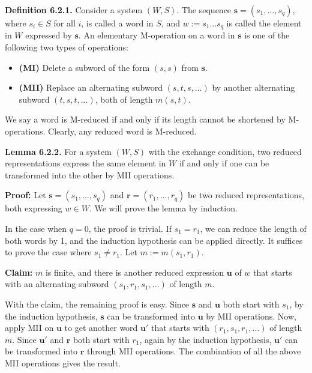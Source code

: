 \documentclass[../main.tex]{subfiles}
\begin{document}
\noindent \textbf{Definition 6.2.1.} Consider a system $(W, S)$. The sequence $\mathbf{s} = (s_1, \dots, s_q)$, where $s_i \in S$ for all $i$, is called a word in $S$, and $w := s_1 \dots s_q$ is called the element in $W$ expressed by $\mathbf{s}$. An elementary M-operation on a word in $\mathbf{s}$ is one of the following two types of operations:

\begin{itemize}
    \item \textbf{(MI)} Delete a subword of the form $(s, s)$ from $\mathbf{s}$.
    \item \textbf{(MII)} Replace an alternating subword $(s, t, s, \dots)$ by another alternating subword $(t, s, t, \dots)$, both of length $m(s,t)$.
\end{itemize}

We say a word is M-reduced if and only if its length cannot be shortened by M-operations. Clearly, any reduced word is M-reduced.

\vspace{\baselineskip}

\noindent \textbf{Lemma 6.2.2.} For a system $(W, S)$ with the exchange condition, two reduced representations express the same element in $W$ if and only if one can be transformed into the other by MII operations.

\vspace{0.5\baselineskip}

\noindent \textbf{Proof:} Let $\mathbf{s} = (s_1, \dots, s_q)$ and $\mathbf{r} = (r_1, \dots, r_q)$ be two reduced representations, both expressing $w \in W$. We will prove the lemma by induction.

In the case when $q = 0$, the proof is trivial. If $s_1 = r_1$, we can reduce the length of both words by 1, and the induction hypothesis can be applied directly. It suffices to prove the case where $s_1 \neq r_1$. Let $m := m(s_1, r_1)$.

\vspace{0.5\baselineskip}

\noindent \textbf{Claim:} $m$ is finite, and there is another reduced expression $\mathbf{u}$ of $w$ that starts with an alternating subword $(s_1, r_1, s_1, \dots)$ of length $m$.

\vspace{0.5\baselineskip}

With the claim, the remaining proof is easy. Since $\mathbf{s}$ and $\mathbf{u}$ both start with $s_1$, by the induction hypothesis, $\mathbf{s}$ can be transformed into $\mathbf{u}$ by MII operations. Now, apply MII on $\mathbf{u}$ to get another word $\mathbf{u'}$ that starts with $(r_1, s_1, r_1, \dots)$ of length $m$. Since $\mathbf{u'}$ and $\mathbf{r}$ both start with $r_1$, again by the induction hypothesis, $\mathbf{u'}$ can be transformed into $\mathbf{r}$ through MII operations. The combination of all the above MII operations gives the result.
\end{document}
